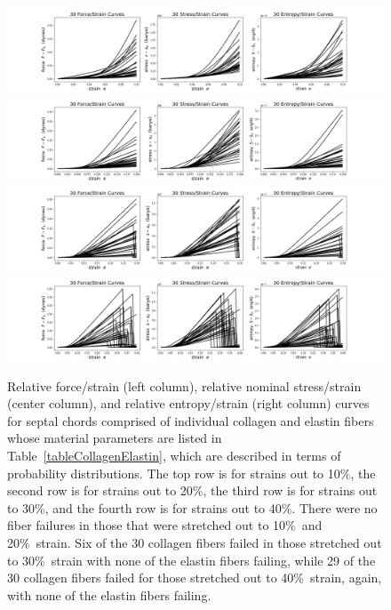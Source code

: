 \begin{figure}
    \mbox{}\hspace{-1.5cm}
    \includegraphics[width=1.2\textwidth]{figures/septalChords10.jpg}
    \mbox{}\hspace{-1.5cm}
    \includegraphics[width=1.2\textwidth]{figures/septalChords20.jpg}
    \mbox{}\hspace{-1.5cm}
    \includegraphics[width=1.2\textwidth]{figures/septalChords30.jpg}
    \mbox{}\hspace{-1.5cm}
    \includegraphics[width=1.2\textwidth]{figures/septalChords40.jpg}
    \caption{Relative force\slash strain (left column), relative nominal stress\slash strain (center column), and relative entropy\slash strain (right column) curves for septal chords comprised of individual collagen and elastin fibers whose material parameters are listed in Table~\ref{tableCollagenElastin}, which are described in terms of probability distributions.  The top row is for strains out to 10\%, the second row is for strains out to 20\%, the third row is for strains out to 30\%, and the fourth row is for strains out to 40\%.  There were no fiber failures in those that were stretched out to 10\%\ and 20\%\ strain.  Six of the 30 collagen fibers failed in those stretched out to 30\%\ strain with none of the elastin fibers failing, while 29 of the 30 collagen fibers failed for those stretched out to 40\%\ strain, again, with none of the elastin fibers failing.}
    \label{figStressStrainFibers}
\end{figure}

